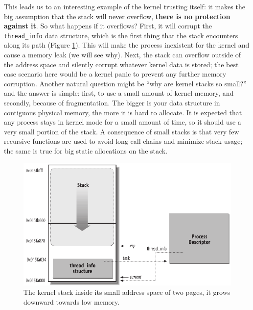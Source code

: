\documentclass[10pt]{book}
\begin{document}
This leads us to an interesting example of the kernel trusting itself: it makes the big assumption that the stack will never overflow, \textbf{there is no protection against it}. So what happens if it overflows? First, it will corrupt the \verb|thread_info| data structure, which is the first thing that the stack encounters along its path (Figure \ref{img:stack}). This will make the process inexistent for the kernel and cause a memory leak (we will see why). Next, the stack can overflow outside of the address space and silently corrupt whatever kernel data is stored; the best case scenario here would be a kernel panic to prevent any further memory corruption. Another natural question might be ``why are kernel stacks so small?'' and the answer is simple: first, to use a small amount of kernel memory, and secondly, because of fragmentation. The bigger is your data structure in contiguous physical memory, the more it is hard to allocate. It is expected that any process stays in kernel mode for a small amount of time, so it should use a very small portion of the stack. A consequence of small stacks is that very few recursive functions are used to avoid long call chains and minimize stack usage; the same is true for big static allocations on the stack. %

\begin{figure}[ht]
\includegraphics[width=\textwidth]{images/stack.png}
\caption{The kernel stack inside its small address space of two pages, it grows downward towards low memory.}
\label{img:stack}
\end{figure}
\end{document}
